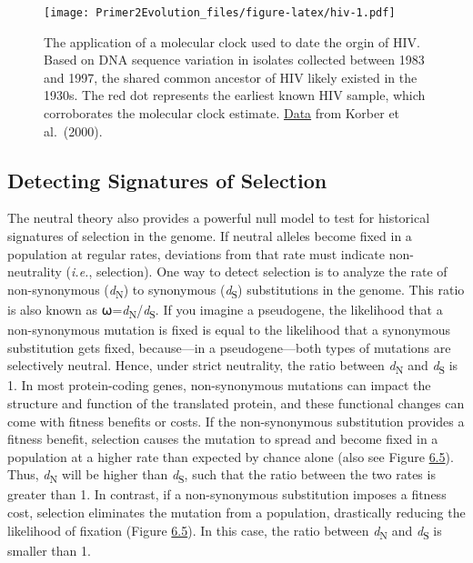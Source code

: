 \documentclass[
]{book}
\begin{document}
\begin{figure}
\centering
\texttt{[image: Primer2Evolution\_files/figure-latex/hiv-1.pdf]}
\caption{\label{fig:hiv}The application of a molecular clock used to date the orgin of HIV. Based on DNA sequence variation in isolates collected between 1983 and 1997, the shared common ancestor of HIV likely existed in the 1930s. The red dot represents the earliest known HIV sample, which corroborates the molecular clock estimate. \href{data/7_hiv.csv}{Data} from Korber et al.~(2000).}
\end{figure}

\hypertarget{detecting-signatures-of-selection}{%
\subsection{Detecting Signatures of Selection}\label{detecting-signatures-of-selection}}

The neutral theory also provides a powerful null model to test for historical signatures of selection in the genome. If neutral alleles become fixed in a population at regular rates, deviations from that rate must indicate non-neutrality (\emph{i.e.}, selection). One way to detect selection is to analyze the rate of non-synonymous (\emph{d}\textsubscript{N}) to synonymous (\emph{d}\textsubscript{S}) substitutions in the genome. This ratio is also known as ⍵=\emph{d}\textsubscript{N}/\emph{d}\textsubscript{S}. If you imagine a pseudogene, the likelihood that a non-synonymous mutation is fixed is equal to the likelihood that a synonymous substitution gets fixed, because---in a pseudogene---both types of mutations are selectively neutral. Hence, under strict neutrality, the ratio between \emph{d}\textsubscript{N} and \emph{d}\textsubscript{S} is 1. In most protein-coding genes, non-synonymous mutations can impact the structure and function of the translated protein, and these functional changes can come with fitness benefits or costs. If the non-synonymous substitution provides a fitness benefit, selection causes the mutation to spread and become fixed in a population at a higher rate than expected by chance alone (also see Figure \href{evolutionary-mechanisms-ii-mutation-genetic-drift-migration-and-non-random-mating.html\#fig:driftsel}{6.5}). Thus, \emph{d}\textsubscript{N} will be higher than \emph{d}\textsubscript{S}, such that the ratio between the two rates is greater than 1. In contrast, if a non-synonymous substitution imposes a fitness cost, selection eliminates the mutation from a population, drastically reducing the likelihood of fixation (Figure \href{evolutionary-mechanisms-ii-mutation-genetic-drift-migration-and-non-random-mating.html\#fig:driftsel}{6.5}). In this case, the ratio between \emph{d}\textsubscript{N} and \emph{d}\textsubscript{S} is smaller than 1.
\end{document}
